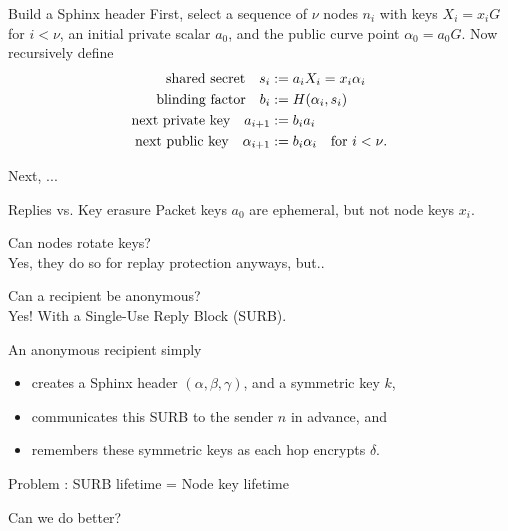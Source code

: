 \documentclass[fleqn,xcolor={usenames,dvipsnames}]{beamer}
\begin{document}
\begin{frame}{Build a Sphinx header}
First, select a sequence of $\nu$ nodes $n_i$ with keys $X_i = x_i G$ for $i<\nu$,
 an initial private scalar $a_0$, and
 the public curve point $\alpha_0 = a_0 G$.
Now recursively define
\[ \begin{aligned}
\textrm{shared secret}\quad
 s_i &:= a_i X_i = x_i \alpha_i \mathcomma \\
\textrm{blinding factor}\quad
 b_i &:= H(\alpha_i,s_i) \mathcomma \\
\textrm{next private key}\quad
 a_{i+1} &:= b_i a_i \mathcomma \\ %
\textrm{next public key}\quad
 \alpha_{i+1} &:= b_i \alpha_i \quad\textrm{for $i < \nu$.} \\
\end{aligned} \]

Next, ...

\end{frame}


\begin{frame}[t]{Replies vs. Key erasure}
Packet keys $a_0$ are ephemeral, but not node keys $x_i$.  

\medskip

Can nodes rotate keys?  \\
Yes, they do so for replay protection anyways, but..

\bigskip
\pause

Can a recipient be anonymous? \\
Yes!  With a Single-Use Reply Block (SURB).

\medskip
An anonymous recipient simply
\begin{itemize}
\item creates a Sphinx header $(\alpha, \beta, \gamma)$, 
 and a symmetric key $k$, 
\item communicates this SURB to the sender $n$ in advance, and 
\item remembers these symmetric keys as each hop encrypts $\delta$.
\end{itemize}

\bigskip
\pause

Problem : SURB lifetime = Node key lifetime

\medskip
\hspace*{80pt} Can we do better?

\end{frame}
\end{document}
